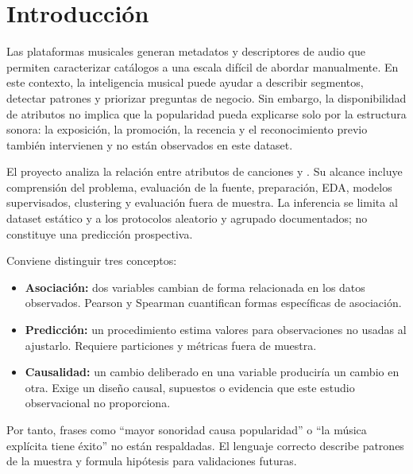 \section{Introducción}

Las plataformas musicales generan metadatos y descriptores de audio que permiten caracterizar
catálogos a una escala difícil de abordar manualmente. En este contexto, la inteligencia musical
puede ayudar a describir segmentos, detectar patrones y priorizar preguntas de negocio. Sin
embargo, la disponibilidad de atributos no implica que la popularidad pueda explicarse solo por la
estructura sonora: la exposición, la promoción, la recencia y el reconocimiento previo también
intervienen y no están observados en este dataset.

El proyecto analiza la relación entre atributos de canciones y . Su alcance
incluye comprensión del problema, evaluación de la fuente, preparación, EDA, modelos supervisados,
clustering y evaluación fuera de muestra. La inferencia se limita al dataset estático y a los
protocolos aleatorio y agrupado documentados; no constituye una predicción prospectiva.

Conviene distinguir tres conceptos:

\begin{itemize}
\item \textbf{Asociación:} dos variables cambian de forma relacionada en los datos observados. Pearson y
Spearman cuantifican formas específicas de asociación.
\item \textbf{Predicción:} un procedimiento estima valores para observaciones no usadas al ajustarlo. Requiere
particiones y métricas fuera de muestra.
\item \textbf{Causalidad:} un cambio deliberado en una variable produciría un cambio en otra. Exige un diseño
causal, supuestos o evidencia que este estudio observacional no proporciona.
\end{itemize}

Por tanto, frases como ``mayor sonoridad causa popularidad'' o ``la música explícita tiene éxito'' no
están respaldadas. El lenguaje correcto describe patrones de la muestra y formula hipótesis para
validaciones futuras.
